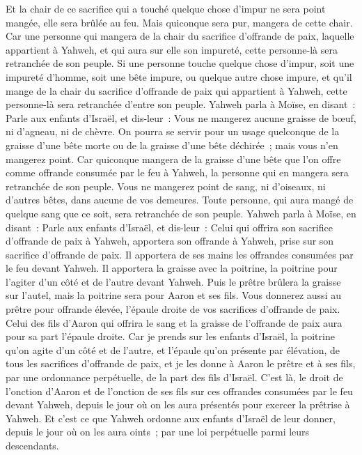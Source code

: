 \begin{multicols}{2}
Et la chair de ce sacrifice qui a touché quelque chose d'impur ne sera point mangée, elle sera brûlée au feu. Mais quiconque sera pur, mangera de cette chair.
Car une personne qui mangera de la chair du sacrifice d'offrande de paix, laquelle appartient à Yahweh, et qui aura sur elle son impureté, cette personne-là sera retranchée de son peuple.
Si une personne touche quelque chose d'impur, soit une impureté d'homme, soit une bête impure, ou quelque autre chose impure, et qu'il mange de la chair du sacrifice d'offrande de paix qui appartient à Yahweh, cette personne-là sera retranchée d'entre son peuple.
Yahweh parla à Moïse, en disant~:
Parle aux enfants d'Israël, et dis-leur~: Vous ne mangerez aucune graisse de bœuf, ni d'agneau, ni de chèvre.
On pourra se servir pour un usage quelconque de la graisse d'une bête morte ou de la graisse d'une bête déchirée~; mais vous n'en mangerez point.
Car quiconque mangera de la graisse d'une bête que l'on offre comme offrande consumée par le feu à Yahweh, la personne qui en mangera sera retranchée de son peuple.
Vous ne mangerez point de sang, ni d'oiseaux, ni d'autres bêtes, dans aucune de vos demeures.
Toute personne, qui aura mangé de quelque sang que ce soit, sera retranchée de son peuple.
Yahweh parla à Moïse, en disant~:
Parle aux enfants d'Israël, et dis-leur~: Celui qui offrira son sacrifice d'offrande de paix à Yahweh, apportera son offrande à Yahweh, prise sur son sacrifice d'offrande de paix.
Il apportera de ses mains les offrandes consumées par le feu devant Yahweh. Il apportera la graisse avec la poitrine, la poitrine pour l'agiter d'un côté et de l'autre devant Yahweh.
Puis le prêtre brûlera la graisse sur l'autel, mais la poitrine sera pour Aaron et ses fils.
Vous donnerez aussi au prêtre pour offrande élevée, l'épaule droite de vos sacrifices d'offrande de paix.
Celui des fils d'Aaron qui offrira le sang et la graisse de l'offrande de paix aura pour sa part l'épaule droite.
Car je prends sur les enfants d'Israël, la poitrine qu'on agite d'un côté et de l'autre, et l'épaule qu'on présente par élévation, de tous les sacrifices d'offrande de paix, et je les donne à Aaron le prêtre et à ses fils, par une ordonnance perpétuelle, de la part des fils d'Israël.
C'est là, le droit de l'onction d'Aaron et de l'onction de ses fils sur ces offrandes consumées par le feu devant Yahweh, depuis le jour où on les aura présentés pour exercer la prêtrise à Yahweh.
Et c'est ce que Yahweh ordonne aux enfants d'Israël de leur donner, depuis le jour où on les aura oints~; par une loi perpétuelle parmi leurs descendants.

\end{multicols}
